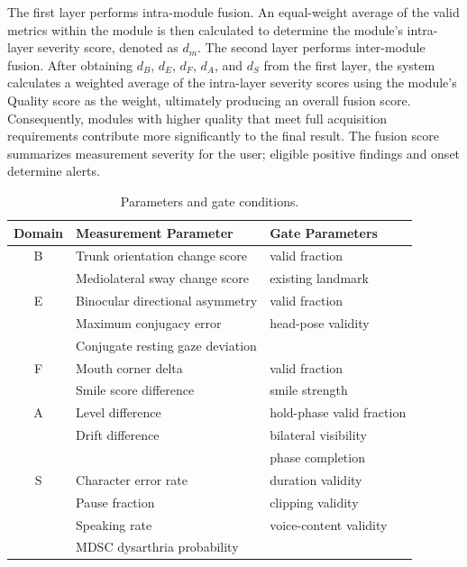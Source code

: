 \documentclass[conference]{IEEEtran}
\providecommand{\revisioncolor}{black}
\DeclareRobustCommand{\revised}[1]{{\color{\revisioncolor}#1}}
\begin{document}
The first layer performs intra-module fusion. An equal-weight average of the valid metrics within the module is then calculated to determine the module's intra-layer severity score, denoted as \(d_m\).
The second layer performs inter-module fusion. After obtaining \(d_B\), \(d_E\), \(d_F\), \(d_A\), and \(d_S\) from the first layer, the system calculates a weighted average of the intra-layer severity scores using the module's Quality score as the weight, ultimately producing an overall fusion score.
Consequently, modules with higher quality that meet full acquisition requirements contribute more significantly to the final result.
\revised{The fusion score summarizes measurement severity for the user; eligible positive findings and onset determine alerts.}



\begin{table}[htbp]
\caption{Parameters and gate conditions.}
\label{tab:fusion_parameters}
\centering
\setlength{\tabcolsep}{5.5pt}
\begin{tabular}{|c|l|l|}
\hline
\textbf{Domain} & \textbf{Measurement Parameter} & \textbf{Gate Parameters} \\
\hline
B & Trunk orientation change score & valid fraction \\
  & Mediolateral sway change score  & existing landmark \\
\hline
E & Binocular directional asymmetry & valid fraction \\
  & Maximum conjugacy error         & head-pose validity \\
  & Conjugate resting gaze deviation & \\
\hline
F & Mouth corner delta              & valid fraction \\
  & Smile score difference          & smile strength \\
\hline
A & Level difference                & hold-phase valid fraction \\
  & Drift difference                & bilateral visibility \\
  &                                 & phase completion \\
\hline
S & Character error rate            & duration validity \\
  & Pause fraction                  & clipping validity \\
  & Speaking rate                   & voice-content validity \\
  & MDSC dysarthria probability     & \\
\hline
\end{tabular}
\end{table}
\end{document}
